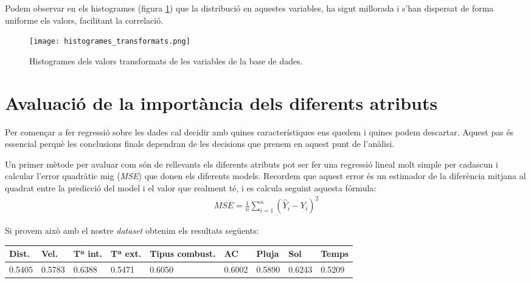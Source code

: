 \documentclass[a4paper, 11pt]{article}
\begin{document}
    Podem observar en els histogrames (figura \ref{fig:H_T}) que la distribució en aquestes variables,
    ha sigut millorada i s'han dispersat de forma uniforme els valors, facilitant la correlació.

    \begin{figure}[H]
        \centering
        \texttt{[image: histogrames\_transformats.png]}
        \caption{Histogrames dels valors transformats de les variables de la base de dades.}
        \label{fig:H_T}
    \end{figure}





\newpage
    \section{Avaluació de la importància dels diferents atributs}


        Per començar a fer regressió sobre les dades cal decidir amb quines característiques ens
        quedem i quines podem descartar. Aquest pas és essencial perquè les conclusions finals
        dependran de les decisions que prenem en aquest punt de l'anàlisi.

        Un primer mètode per avaluar com són de rellevants els diferents atributs pot ser fer una
        regressió lineal molt simple per cadascun i calcular l'error quadràtic mig (\textit{MSE})
        que donen els diferents models.
        Recordem que aquest error és un estimador de la diferència mitjana al quadrat entre la
        predicció del model i el valor que realment té, i es calcula seguint aquesta fórmula:
        \begin{gather*}
          MSE = \frac{1}{n}\sum_{i=1}^n (\hat{Y}_i - Y_i)^2
        \end{gather*}


        Si provem això amb el nostre \textit{dataset} obtenim els resultats següents:\\

        \begin{table}[H]
            \centering
            \begin{tabular}{lllllllll}
                \hline
                \multicolumn{1}{|l|}{\textbf{Dist.}} & \multicolumn{1}{l|}{\textbf{Vel.}} & \multicolumn{1}{l|}{\textbf{Tª int.}} & \multicolumn{1}{l|}{\textbf{Tª ext.}} & \multicolumn{1}{l|}{\textbf{Tipus combust.}} & \multicolumn{1}{l|}{\textbf{AC}} & \multicolumn{1}{l|}{\textbf{Pluja}} & \multicolumn{1}{l|}{\textbf{Sol}} & \multicolumn{1}{l|}{\textbf{Temps}} \\ \hline
                0.5405                                   & 0.5783                                  & 0.6388                                & 0.5471                                & 0.6050                                   & 0.6002                           & 0.5890                              & 0.6243                            & 0.5209
            \end{tabular}
        \end{table}
\end{document}
